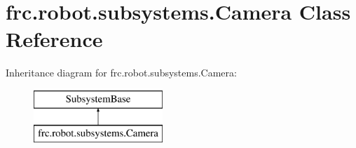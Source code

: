 \hypertarget{classfrc_1_1robot_1_1subsystems_1_1_camera}{}\section{frc.\+robot.\+subsystems.\+Camera Class Reference}
\label{classfrc_1_1robot_1_1subsystems_1_1_camera}
Inheritance diagram for frc.\+robot.\+subsystems.\+Camera\+:\begin{figure}[H]
\begin{center}
\leavevmode
\includegraphics[height=2.000000cm]{classfrc_1_1robot_1_1subsystems_1_1_camera}
\end{center}
\end{figure}
